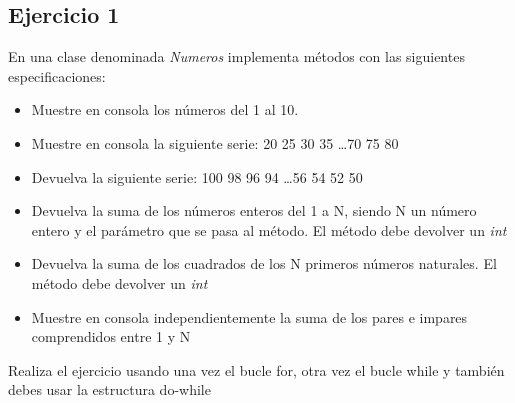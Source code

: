 \documentclass[4paper]{article}
\begin{document}
\subsection{Ejercicio 1}
En una clase denominada \emph{Numeros} implementa métodos con las siguientes especificaciones:
\begin{itemize}
\item Muestre en consola los números del 1 al 10.
\item Muestre en consola la siguiente serie: 20 25 30 35 \dots 70 75 80
\item Devuelva la siguiente serie: 100 98 96 94 \dots 56 54 52 50
\item Devuelva la suma de los números enteros del 1 a N, siendo N un número entero y el parámetro que se pasa al método. El método debe devolver un \emph{int}
\item Devuelva la suma de los cuadrados de los N primeros números naturales. El método debe devolver un \emph{int}
\item Muestre en consola independientemente la suma de los pares e impares comprendidos entre 1 y N
\end{itemize}
Realiza el ejercicio usando una vez el bucle for, otra vez el bucle while y también debes usar la estructura do-while
\end{document}
